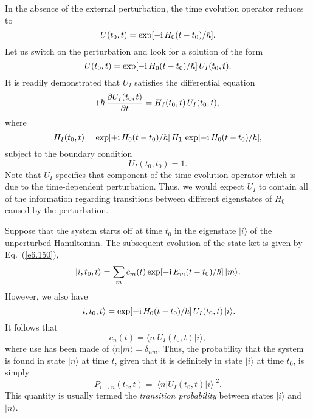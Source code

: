 In the absence of the external perturbation, the time evolution operator
reduces to
\begin{equation}
U(t_0, t) =  \exp[-{\rm i} \, H_0(t-t_0)/\hbar].
\end{equation}
Let us switch on the perturbation and look for a solution of the
form
\begin{equation}
U(t_0, t) = \exp[ -{\rm i} \, H_0(t-t_0)/\hbar]\, U_I(t_0, t).
\end{equation}
It is readily demonstrated that $U_I$ satisfies the differential
equation
\begin{equation}\label{e6.188}
{\rm i}\, \hbar\, \frac{\partial U_I(t_0, t)}{\partial t} =  H_I(t_0, t)\,
U_I(t_0, t),
\end{equation}
where
\begin{equation}
H_I(t_0,t) = \exp[ +{\rm i} \, H_0(t-t_0)/\hbar] \, H_1\,
\exp[ -{\rm i} \, H_0(t-t_0)/\hbar],
\end{equation}
subject to the boundary condition
\begin{equation}\label{e6.190}
U_I(t_0, t_0) = 1.
\end{equation}
Note that $U_I$ specifies that  component of the time evolution operator
which is due to the time-dependent perturbation. Thus, we would expect $U_I$
to contain all of the information regarding transitions between different
eigenstates of $H_0$ caused by the perturbation. 

Suppose that the system starts off at time $t_0$ in the eigenstate $|i\rangle$ of
the unperturbed Hamiltonian. The subsequent evolution of
the state ket is given by Eq.~(\ref{e6.150}),
\begin{equation}
|i, t_0, t\rangle = \sum_m c_m(t) \exp[ -{\rm i} \, E_m(t-t_0)/\hbar]\,
|m\rangle.
\end{equation}
However, we also have
\begin{equation}
|i, t_0, t\rangle = \exp[-{\rm i} \, H_0(t-t_0)/\hbar]\, U_I(t_0, t)\, |i\rangle.
\end{equation}
It follows that
\begin{equation}\label{e6.193}
c_n(t) = \langle n| U_I(t_0, t) | i\rangle,
\end{equation}
where use has been made of $\langle n|m \rangle = \delta_{nm}$. 
Thus, the probability that the system is found in state $|n\rangle$ at time
$t$, given that it is definitely in state $|i\rangle$ at time $t_0$,
is simply
\begin{equation}
P_{i\rightarrow n} (t_0, t) = |\langle n| U_I(t_0, t) | i\rangle|^2.
\end{equation}
This quantity is usually  termed the {\em transition probability}
between states $|i\rangle$ and $|n\rangle$.

